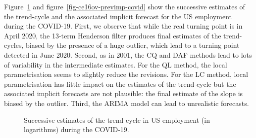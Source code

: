 \documentclass[
]{article}
\newcommand\1{\mathds{1}}
\begin{document}
Figure~\ref{fig-ce16ovcovid} and figure~\ref{fig-ce16ov-previmp-covid}
show the successive estimates of the trend-cycle and the associated
implicit forecast for the US employment during the COVID-19. First, we
observe that while the real turning point is in April 2020, the 13-term
Henderson filter produces final estimates of the trend-cycles, biased by
the presence of a huge outlier, which lead to a turning point detected
in June 2020. Second, as in 2001, the CQ and DAF methods lead to lots of
variability in the intermediate estimates. For the QL method, the local
parametrisation seems to slightly reduce the revisions. For the LC
method, local parametrisation has little impact on the estimates of the
trend-cycle but the associated implicit forecasts are not plausible: the
final estimate of the slope is biased by the outlier. Third, the ARIMA
model can lead to unrealistic forecasts.

\begin{figure}[H]

\caption{\label{fig-ce16ovcovid}Successive estimates of the trend-cycle
in US employment (in logarithms) during the COVID-19.}


\end{figure}%
\end{document}
